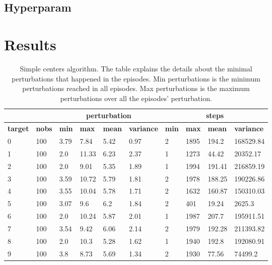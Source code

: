\documentclass{article}
\begin{document}
\subsection{Hyperparam}


\section{Results}

\begin{table}[]
\caption{Simple centers algorithm. The table explains the details about the minimal perturbations that happened in the episodes. Min perturbations is the minimum perturbations reached in all episodes. Max perturbations is the maximum perturbations over all the episodes' perturbation.}
\label{tab:simple_result}
\begin{tabular}{|l|l|l|l|l|l|l|l|l|l|}
\hline
\textbf{}       & \textbf{}     & \multicolumn{4}{c|}{\textbf{perturbation}}                      & \multicolumn{4}{c|}{\textbf{steps}}                             \\ \hline
\textbf{target} & \textbf{nobs} & \textbf{min} & \textbf{max} & \textbf{mean} & \textbf{variance} & \textbf{min} & \textbf{max} & \textbf{mean} & \textbf{variance} \\ \hline
0 & 100  & 3.79     & 7.84     & 5.42      & 0.97          & 2         & 1895      & 194.2      & 168529.84      \\ \hline
1 & 100  & 2.0      & 11.33    & 6.23      & 2.37          & 1         & 1273      & 44.42      & 20352.17       \\ \hline
2 & 100  & 2.0      & 9.01     & 5.35      & 1.89          & 1         & 1994      & 191.41     & 216859.19      \\ \hline
3 & 100  & 3.59     & 10.72    & 5.79      & 1.81          & 2         & 1978      & 188.25     & 190226.86      \\ \hline
4 & 100  & 3.55     & 10.04    & 5.78      & 1.71          & 2         & 1632      & 160.87     & 150310.03      \\ \hline
5 & 100  & 3.07     & 9.6      & 6.2       & 1.84          & 2         & 401       & 19.24      & 2625.3         \\ \hline
6 & 100  & 2.0      & 10.24    & 5.87      & 2.01          & 1         & 1987      & 207.7      & 195911.51      \\ \hline
7 & 100  & 3.54     & 9.42     & 6.06      & 2.14          & 2         & 1979      & 192.28     & 211393.82      \\ \hline
8 & 100  & 2.0      & 10.3     & 5.28      & 1.62          & 1         & 1940      & 192.8      & 192080.91      \\ \hline
9 & 100  & 3.8      & 8.73     & 5.69      & 1.34          & 2         & 1930      & 77.56      & 74499.2        \\ \hline
\end{tabular}
\end{table}
\end{document}
